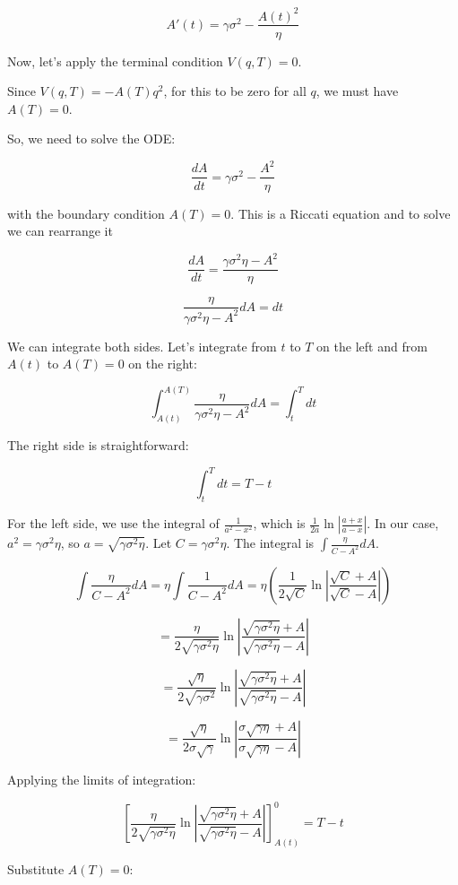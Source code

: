 $$A'(t) = \gamma \sigma^2 - \frac{A(t)^2}{\eta}$$

Now, let’s apply the terminal condition $V(q, T) = 0$.

Since $V(q, T) = -A(T) q^2$, for this to be zero for all $q$, we must have $A(T) = 0$.

So, we need to solve the ODE:

$$\frac{dA}{dt} = \gamma \sigma^2 - \frac{A^2}{\eta}$$

with the boundary condition $A(T) = 0$. This is a Riccati equation \cite{wiki:ricatti-equation} and to solve we can rearrange it

$$\frac{dA}{dt} = \frac{\gamma \sigma^2 \eta - A^2}{\eta}$$

$$\frac{\eta}{\gamma \sigma^2 \eta - A^2} dA = dt$$

We can integrate both sides. Let’s integrate from $t$ to $T$ on the left and from $A(t)$ to $A(T)=0$ on the right:

$$\int_{A(t)}^{A(T)} \frac{\eta}{\gamma \sigma^2 \eta - A^2} dA = \int_{t}^{T} dt$$

The right side is straightforward:

$$\int_{t}^{T} dt = T - t$$

For the left side, we use the integral of $\frac{1}{a^2 - x^2}$, which is $\frac{1}{2a} \ln\left|\frac{a+x}{a-x}\right|$. In our case, $a^2 = \gamma \sigma^2 \eta$, so $a = \sqrt{\gamma \sigma^2 \eta}$. Let $C = \gamma \sigma^2 \eta$. The integral is $\int \frac{\eta}{C - A^2} dA$.

$$\int \frac{\eta}{C - A^2} dA = \eta \int \frac{1}{C - A^2} dA = \eta \left( \frac{1}{2\sqrt{C}} \ln\left|\frac{\sqrt{C}+A}{\sqrt{C}-A}\right| \right)$$

$$= \frac{\eta}{2\sqrt{\gamma \sigma^2 \eta}} \ln\left|\frac{\sqrt{\gamma \sigma^2 \eta}+A}{\sqrt{\gamma \sigma^2 \eta}-A}\right|$$

$$= \frac{\sqrt{\eta}}{2\sqrt{\gamma \sigma^2}} \ln\left|\frac{\sqrt{\gamma \sigma^2 \eta}+A}{\sqrt{\gamma \sigma^2 \eta}-A}\right|$$

$$= \frac{\sqrt{\eta}}{2\sigma\sqrt{\gamma}} \ln\left|\frac{\sigma\sqrt{\gamma \eta}+A}{\sigma\sqrt{\gamma \eta}-A}\right|$$

Applying the limits of integration:

$$\left[ \frac{\eta}{2\sqrt{\gamma \sigma^2 \eta}} \ln\left|\frac{\sqrt{\gamma \sigma^2 \eta}+A}{\sqrt{\gamma \sigma^2 \eta}-A}\right| \right]_{A(t)}^{0} = T - t$$

Substitute 
$A(T)=0$:

